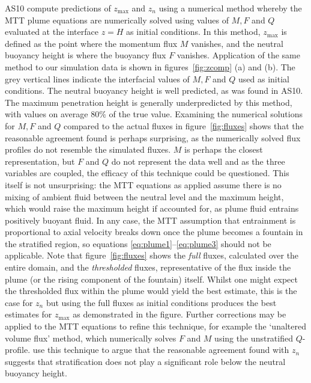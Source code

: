 \documentclass[a4paper]{article}
\begin{document}
AS10 compute predictions of $z_{\max}$ and $z_n$ using a numerical method whereby the MTT plume equations are
numerically solved using values of $M, F$ and $Q$ evaluated at the interface $z=H$ as initial conditions. In
this method, $z_{\max}$ is defined as the point where the momentum flux $M$ vanishes, and the neutral buoyancy
height is where the buoyancy flux $F$ vanishes. Application of the same method to our simulation data is shown
in figures~\ref{fig:zcomp} (a) and (b). The grey vertical lines indicate the interfacial values of $M, F$ and
$Q$ used as initial conditions. The neutral buoyancy height is well predicted, as was found in AS10. The
maximum penetration height is generally underpredicted by this method, with values on average $80\%$ of the
true value. Examining the numerical solutions for $M, F$ and $Q$ compared to the actual fluxes in
figure~\ref{fig:fluxes} shows that the reasonable agreement found is perhaps surprising, as the numerically
solved flux profiles do not resemble the simulated fluxes. $M$ is perhaps the closest representation, but $F$
and $Q$ do not represent the data well and as the three variables are coupled, the efficacy of this technique
could be questioned. This itself is not unsurprising: the MTT equations as applied assume there is no mixing
of ambient fluid between the neutral level and the maximum height, which would raise the maximum height if
accounted for, as plume fluid entrains positively buoyant fluid. In any case, the MTT assumption that
entrainment is proportional to axial velocity breaks down once the plume becomes a fountain in the stratified
region, so equations \eqref{eq:plume1}--\eqref{eq:plume3} should not be applicable. Note that
figure~\ref{fig:fluxes} shows the \emph{full} fluxes, calculated over the entire domain, and the
\emph{thresholded} fluxes, representative of the flux inside the plume (or the rising component of the
fountain) itself. Whilst one might expect the thresholded flux within the plume would yield the best estimate,
this is the case for $z_n$ but using the full fluxes as initial conditions produces the best estimates for
$z_{\max}$ as demonstrated in the figure. Further corrections may be applied to the MTT equations to refine
this technique, for example the `unaltered volume flux' method, which numerically solves $F$ and $M$ using the
unstratified $Q$-profile. \citet{devenish2010} use this technique to argue that the reasonable agreement found
with $z_n$ suggests that stratification does not play a significant role below the neutral buoyancy height.
\end{document}
